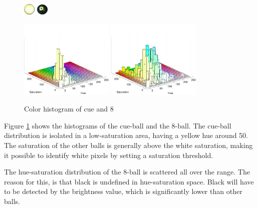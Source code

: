 \begin{figure}[H]
\centering
\subfloat
{
	\includegraphics[width=0.05\textwidth]{images/balls/0.png}
}
\hspace{0.4\textwidth}
\subfloat
{
	\includegraphics[width=0.05\textwidth]{images/balls/8.png}
}

\subfloat
{
	\includegraphics[width=0.4\textwidth]{images/ballhist/0}
}
\subfloat
{
	\includegraphics[width=0.4\textwidth]{images/ballhist/8}
}
\caption{Color histogram of cue and 8}
\label{fig:ballhist-cue-8}
\end{figure}
Figure \ref{fig:ballhist-cue-8} shows the histograms of the cue-ball and the 8-ball. The cue-ball distribution is isolated in a low-saturation area, having a yellow hue around 50. The saturation of the other balls is generally above the white saturation, making it possible to identify white pixels by setting a saturation threshold.

The hue-saturation distribution of the 8-ball is scattered all over the range. The reason for this, is that black is undefined in hue-saturation space. Black will have to be detected by the brightness value, which is significantly lower than other balls. 

